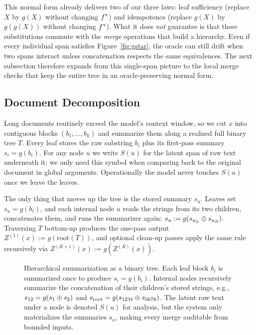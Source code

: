 This normal form already delivers two of our three laws: leaf sufficiency (replace $X$ by $g(X)$ without changing $f^{\ast}$) and idempotence (replace $g(X)$ by $g(g(X))$ without changing $f^{\ast}$). What it does \emph{not} guarantee is that these substitutions commute with the \emph{merge} operations that build a hierarchy. Even if every individual span satisfies Figure~\ref{fig:gstar}, the oracle can still drift when two spans interact unless concatenation respects the same equivalences. The next subsection therefore expands from this single-span picture to the local merge checks that keep the entire tree in an oracle-preserving normal form.

\subsection{Document Decomposition}

Long documents routinely exceed the model's context window, so we cut $x$ into contiguous blocks $(b_1, \ldots, b_k)$ and summarize them along a realized full binary tree $T$. Every leaf stores the raw substring $b_i$ plus its first-pass summary $s_i = g(b_i)$. For any node $u$ we write $S(u)$ for the latent span of raw text underneath it; we only need this symbol when comparing back to the original document in global arguments. Operationally the model never touches $S(u)$ once we leave the leaves.

The only thing that moves up the tree is the stored summary $s_u$. Leaves set $s_u = g(b_i)$, and each internal node $u$ reads the strings from its two children, concatenates them, and runs the summarizer again: $s_u := g(s_{u_L} \oplus s_{u_R})$. Traversing $T$ bottom-up produces the one-pass output $Z^{(1)}(x) := g(\text{root}(T))$, and optional clean-up passes apply the same rule recursively via $Z^{(R+1)}(x) := g(Z^{(R)}(x))$.

\begin{figure}[t]
    \centering
    
    \caption{Hierarchical summarization as a binary tree. Each leaf block $b_i$ is summarized once to produce $s_i = g(b_i)$. Internal nodes recursively summarize the concatenation of their children's stored strings, e.g., $s_{12} = g(s_1 \oplus s_2)$ and $s_{\mathrm{root}} = g(s_{1234} \oplus s_{5678})$. The latent raw text under a node is denoted $S(u)$ for analysis, but the system only materializes the summaries $s_u$, making every merge auditable from bounded inputs.}
    \label{fig:hierarchical_summarization}
\end{figure}

